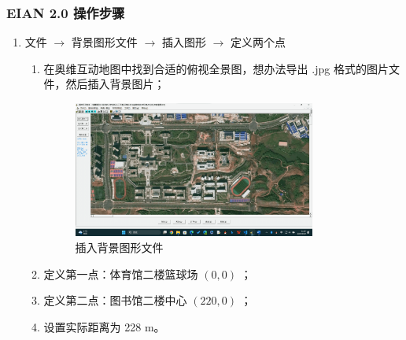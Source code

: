 \subsubsection{EIAN 2.0 操作步骤}
\begin{enumerate}
    \item 文件 $\rightarrow $ 背景图形文件 $\rightarrow $ 插入图形 $\rightarrow $ 定义两个点
    \begin{enumerate}[label=\arabic*)]
        \item 在奥维互动地图中找到合适的俯视全景图，想办法导出 .jpg 格式的图片文件，然后插入背景图片；
        \begin{figure}[H]
            \centering
            \includegraphics[width=0.8\textwidth]{figures/acoustic_step1.png}
            \caption{插入背景图形文件}
        \end{figure}

        \item 定义第一点：体育馆二楼篮球场 $(0,0)$ ；
        \item 定义第二点：图书馆二楼中心 $(220,0)$ ；
        \item 设置实际距离为 228 m。
    \end{enumerate}
    

\end{enumerate}
